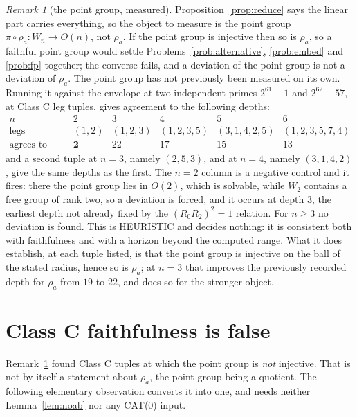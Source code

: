 \documentclass[11pt]{article}
\theoremstyle{definition}
\theoremstyle{remark}
\newtheorem{remark}[theorem]{Remark}
\theoremstyle{definition}
\begin{document}
\begin{remark}[the point group, measured]\label{rem:pointgroup}
Proposition~\ref{prop:reduce} says the linear part carries everything, so the object to measure
is the point group $\pi\circ\rho_a\colon W_n\to O(n)$, not $\rho_a$. If the point group is
injective then so is $\rho_a$, so a faithful point group would settle
Problems~\ref{prob:alternative}, \ref{prob:embed} and \ref{prob:fp} together; the converse
fails, and a deviation of the point group is not a deviation of $\rho_a$. The point group has not
previously been measured on its own. Running it against the envelope at two independent primes
$2^{61}-1$ and $2^{62}-57$, at Class C leg tuples, gives agreement to the following depths:
\[
\begin{array}{r|cccccc}
 n & 2 & 3 & 4 & 5 & 6\\\hline
 \text{legs} & (1,2) & (1,2,3) & (1,2,3,5) & (3,1,4,2,5) & (1,2,3,5,7,4)\\
 \text{agrees to depth} & \textbf{2} & 22 & 17 & 15 & 13
\end{array}
\]
and a second tuple at $n=3$, namely $(2,5,3)$, and at $n=4$, namely $(3,1,4,2)$, give the same
depths as the first. The $n=2$ column is a negative control and it fires: there the point group
lies in $O(2)$, which is solvable, while $W_2$ contains a free group of rank two, so a deviation
is forced, and it occurs at depth $3$, the earliest depth not already fixed by the
$(R_0R_2)^2=1$ relation. For $n\ge3$ no deviation is found. This is HEURISTIC and decides
nothing: it is consistent both with faithfulness and with a horizon beyond the computed range.
What it does establish, at each tuple listed, is that the point group is injective on the ball of
the stated radius, hence so is $\rho_a$; at $n=3$ that improves the previously recorded depth for
$\rho_a$ from $19$ to $22$, and does so for the stronger object.
\end{remark}

\section{Class C faithfulness is false}\label{sec:masterC}

Remark~\ref{rem:pointgroup} found Class C tuples at which the point group is \emph{not}
injective. That is not by itself a statement about $\rho_a$, the point group being a quotient.
The following elementary observation converts it into one, and needs neither
Lemma~\ref{lem:noab} nor any CAT(0) input.
\end{document}
